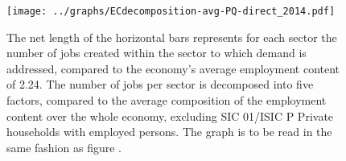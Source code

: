 \documentclass[12pt,english]{article}
\begin{document}
\begin{figure}[!ht]
	\centering
	\texttt{[image: ../graphs/ECdecomposition-avg-PQ-direct\_2014.pdf]}
	\caption{\footnotesize \label{Decomposition_PQ_within}The net length of the horizontal bars represents for each sector the number of jobs created within the sector to which demand is addressed, compared to the economy's average employment content of 2.24. The number of jobs per sector is decomposed into five factors, compared to the average composition of the employment content over the whole economy, excluding SIC 01/ISIC P Private households with employed persons. The graph is to be read in the same fashion as figure \label{Decomposition_PQ}. %
	}
\end{figure}	
\end{document}
